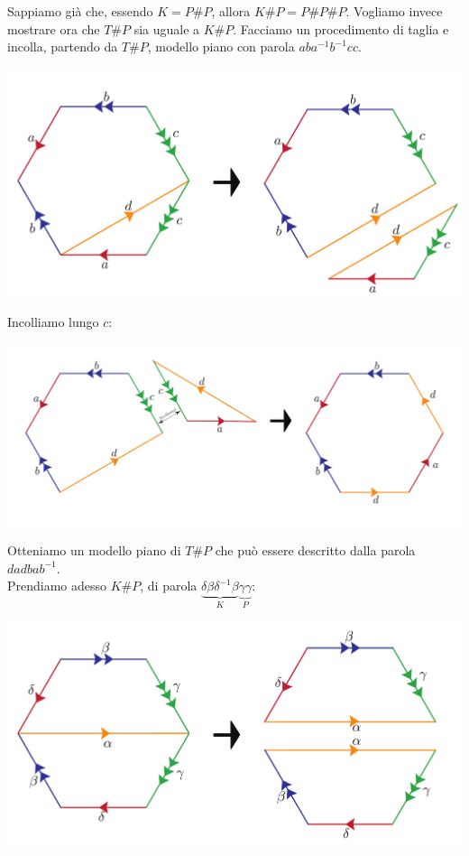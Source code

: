 \begin{demonstration}
	Sappiamo già che, essendo $K=P\# P$, allora $K\# P=P\# P\# P$. Vogliamo invece mostrare ora che $T\# P$ sia uguale a $K\# P$. Facciamo un procedimento di taglia e incolla, partendo da $T\# P$, modello piano con parola $aba^{-1}b^{-1}cc$.
	\begin{center}
			\includegraphics[trim=0cm 0cm 0cm 0cm, clip, scale=0.3]{images/torusplusproj1.pdf}
	\end{center}
Incolliamo lungo $c$:
\begin{center}
	\includegraphics[trim=0cm 0cm 0cm 0cm, clip, scale=0.3]{images/torusplusproj2.pdf}
\end{center}
Otteniamo un modello piano di $T\# P$ che può essere descritto dalla parola $dadbab^{-1}$.\\ Prendiamo adesso $K\# P$, di parola $\underbrace{\delta\beta\delta^{-1}\beta}_{K}\underbrace{\gamma\gamma}_{P}$:
\begin{center}
	\includegraphics[trim=0cm 0cm 0cm 0cm, clip, scale=0.3]{images/kleinplusproj1.pdf}

\end{center}
\end{demonstration}
